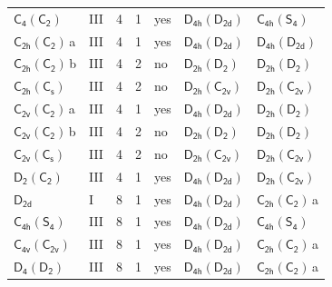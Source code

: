 \documentclass[10pt,a4paper]{article}
\numberwithin{equation}{section}
\newcommand{\grp}[1]{\mathsf{#1}}
\newcommand{\clsletter}[1]{\,{\scriptsize\color{black!55}#1}}
\begin{document}
{\begin{longtable}{@{}llrrlll@{}}
\href{C4-C2.pdf}{$\grp{C_{4}}(\grp{C_{2}})$} & III & 4 & 1 & yes & \href{D4h-D2d.pdf}{$\grp{D_{4h}}(\grp{D_{2d}})$} & \href{C4h-S4.pdf}{$\grp{C_{4h}}(\grp{S_{4}})$}\\
\href{C2h-C2.pdf}{$\grp{C_{2h}}(\grp{C_{2}})$}\clsletter{a} & III & 4 & 1 & yes & \href{D4h-D2d.pdf}{$\grp{D_{4h}}(\grp{D_{2d}})$} & \href{D4h-D2d.pdf}{$\grp{D_{4h}}(\grp{D_{2d}})$}\\
\href{C2h-C2.pdf}{$\grp{C_{2h}}(\grp{C_{2}})$}\clsletter{b} & III & 4 & 2 & no & \href{D2h-D2.pdf}{$\grp{D_{2h}}(\grp{D_{2}})$} & \href{D2h-D2.pdf}{$\grp{D_{2h}}(\grp{D_{2}})$}\\
\href{C2h-C1v.pdf}{$\grp{C_{2h}}(\grp{C_{s}})$} & III & 4 & 2 & no & \href{D2h-C2v.pdf}{$\grp{D_{2h}}(\grp{C_{2v}})$} & \href{D2h-C2v.pdf}{$\grp{D_{2h}}(\grp{C_{2v}})$}\\
\href{C2v-C2.pdf}{$\grp{C_{2v}}(\grp{C_{2}})$}\clsletter{a} & III & 4 & 1 & yes & \href{D4h-D2d.pdf}{$\grp{D_{4h}}(\grp{D_{2d}})$} & \href{D2h-D2.pdf}{$\grp{D_{2h}}(\grp{D_{2}})$}\\
\href{C2v-C2.pdf}{$\grp{C_{2v}}(\grp{C_{2}})$}\clsletter{b} & III & 4 & 2 & no & \href{D2h-D2.pdf}{$\grp{D_{2h}}(\grp{D_{2}})$} & \href{D2h-D2.pdf}{$\grp{D_{2h}}(\grp{D_{2}})$}\\
\href{C2v-C1v.pdf}{$\grp{C_{2v}}(\grp{C_{s}})$} & III & 4 & 2 & no & \href{D2h-C2v.pdf}{$\grp{D_{2h}}(\grp{C_{2v}})$} & \href{D2h-C2v.pdf}{$\grp{D_{2h}}(\grp{C_{2v}})$}\\
\href{D2-C2.pdf}{$\grp{D_{2}}(\grp{C_{2}})$} & III & 4 & 1 & yes & \href{D4h-D2d.pdf}{$\grp{D_{4h}}(\grp{D_{2d}})$} & \href{D2h-C2v.pdf}{$\grp{D_{2h}}(\grp{C_{2v}})$}\\
\href{../../../rotation/data/pdf/D2d.pdf}{$\grp{D_{2d}}$} & I & 8 & 1 & yes & \href{D4h-D2d.pdf}{$\grp{D_{4h}}(\grp{D_{2d}})$} & \href{C2h-C2.pdf}{$\grp{C_{2h}}(\grp{C_{2}})$}\clsletter{a}\\
\href{C4h-S4.pdf}{$\grp{C_{4h}}(\grp{S_{4}})$} & III & 8 & 1 & yes & \href{D4h-D2d.pdf}{$\grp{D_{4h}}(\grp{D_{2d}})$} & \href{C4h-S4.pdf}{$\grp{C_{4h}}(\grp{S_{4}})$}\\
\href{C4v-C2v.pdf}{$\grp{C_{4v}}(\grp{C_{2v}})$} & III & 8 & 1 & yes & \href{D4h-D2d.pdf}{$\grp{D_{4h}}(\grp{D_{2d}})$} & \href{C2h-C2.pdf}{$\grp{C_{2h}}(\grp{C_{2}})$}\clsletter{a}\\
\href{D4-D2.pdf}{$\grp{D_{4}}(\grp{D_{2}})$} & III & 8 & 1 & yes & \href{D4h-D2d.pdf}{$\grp{D_{4h}}(\grp{D_{2d}})$} & \href{C2h-C2.pdf}{$\grp{C_{2h}}(\grp{C_{2}})$}\clsletter{a}\\

\end{longtable}}
\end{document}
